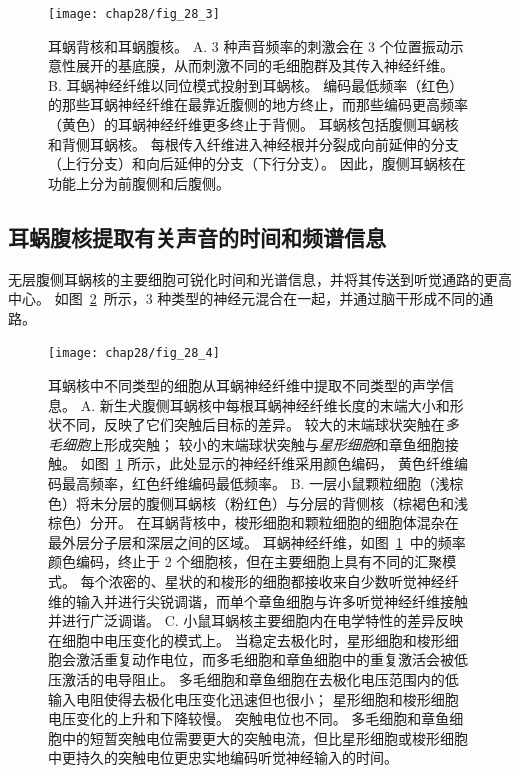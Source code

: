 \begin{figure}[htbp]
	\centering
	\texttt{[image: chap28/fig\_28\_3]}
	\caption{耳蜗背核和耳蜗腹核。
		A. 3 种声音频率的刺激会在 3 个位置振动示意性展开的基底膜，从而刺激不同的毛细胞群及其传入神经纤维。
		B. 耳蜗神经纤维以同位模式投射到耳蜗核。
		编码最低频率（红色）的那些耳蜗神经纤维在最靠近腹侧的地方终止，而那些编码更高频率（黄色）的耳蜗神经纤维更多终止于背侧。
		耳蜗核包括腹侧耳蜗核和背侧耳蜗核。
		每根传入纤维进入神经根并分裂成向前延伸的分支（上行分支）和向后延伸的分支（下行分支）。
		因此，腹侧耳蜗核在功能上分为前腹侧和后腹侧。}
	\label{fig:28_3}
\end{figure}



\subsection{耳蜗腹核提取有关声音的时间和频谱信息}

无层腹侧耳蜗核的主要细胞可锐化时间和光谱信息，并将其传送到听觉通路的更高中心。 
如图~\ref{fig:28_4}~所示，3 种类型的神经元混合在一起，并通过脑干形成不同的通路。


\begin{figure}[htbp]
	\centering
	\texttt{[image: chap28/fig\_28\_4]}
	\caption{耳蜗核中不同类型的细胞从耳蜗神经纤维中提取不同类型的声学信息。
		A. 新生犬腹侧耳蜗核中每根耳蜗神经纤维长度的末端大小和形状不同，反映了它们突触后目标的差异。
		较大的末端球状突触在\textit{多毛细胞}上形成突触；
		较小的末端球状突触与\textit{星形细胞}和章鱼细胞接触。
		如图~\ref{fig:28_3} 所示，此处显示的神经纤维采用颜色编码，
		黄色纤维编码最高频率，红色纤维编码最低频率\cite{y1909histologie}。
		B. 一层小鼠颗粒细胞（浅棕色）将未分层的腹侧耳蜗核（粉红色）与分层的背侧核（棕褐色和浅棕色）分开。 
		在耳蜗背核中，梭形细胞和颗粒细胞的细胞体混杂在最外层分子层和深层之间的区域。
		耳蜗神经纤维，如图~\ref{fig:28_3}~中的频率颜色编码，终止于 2 个细胞核，但在主要细胞上具有不同的汇聚模式。
		每个浓密的、星状的和梭形的细胞都接收来自少数听觉神经纤维的输入并进行尖锐调谐，而单个章鱼细胞与许多听觉神经纤维接触并进行广泛调谐。
		C. 小鼠耳蜗核主要细胞内在电学特性的差异反映在细胞中电压变化的模式上。
		当稳定去极化时，星形细胞和梭形细胞会激活重复动作电位，而多毛细胞和章鱼细胞中的重复激活会被低压激活的电导阻止。
		多毛细胞和章鱼细胞在去极化电压范围内的低输入电阻使得去极化电压变化迅速但也很小； 
		星形细胞和梭形细胞电压变化的上升和下降较慢。
		突触电位也不同。
		多毛细胞和章鱼细胞中的短暂突触电位需要更大的突触电流，但比星形细胞或梭形细胞中更持久的突触电位更忠实地编码听觉神经输入的时间。}
	\label{fig:28_4}
\end{figure}


